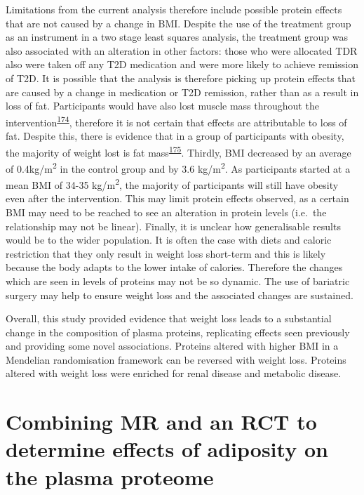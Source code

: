 \documentclass[11pt,twoside]{bristolthesis}
\begin{document}
Limitations from the current analysis therefore include possible protein effects that are not caused by a change in BMI. Despite the use of the treatment group as an instrument in a two stage least squares analysis, the treatment group was also associated with an alteration in other factors: those who were allocated TDR also were taken off any T2D medication and were more likely to achieve remission of T2D. It is possible that the analysis is therefore picking up protein effects that are caused by a change in medication or T2D remission, rather than as a result in loss of fat. Participants would have also lost muscle mass throughout the intervention\textsuperscript{\protect\hyperlink{ref-Santanasto2011}{174}}, therefore it is not certain that effects are attributable to loss of fat. Despite this, there is evidence that in a group of participants with obesity, the majority of weight lost is fat mass\textsuperscript{\protect\hyperlink{ref-Backx2016}{175}}. Thirdly, BMI decreased by an average of 0.4kg/m\textsuperscript{2} in the control group and by 3.6 kg/m\textsuperscript{2}. As participants started at a mean BMI of 34-35 kg/m\textsuperscript{2}, the majority of participants will still have obesity even after the intervention. This may limit protein effects observed, as a certain BMI may need to be reached to see an alteration in protein levels (i.e.~the relationship may not be linear). Finally, it is unclear how generalisable results would be to the wider population. It is often the case with diets and caloric restriction that they only result in weight loss short-term and this is likely because the body adapts to the lower intake of calories. Therefore the changes which are seen in levels of proteins may not be so dynamic. The use of bariatric surgery may help to ensure weight loss and the associated changes are sustained.

Overall, this study provided evidence that weight loss leads to a substantial change in the composition of plasma proteins, replicating effects seen previously and providing some novel associations. Proteins altered with higher BMI in a Mendelian randomisation framework can be reversed with weight loss. Proteins altered with weight loss were enriched for renal disease and metabolic disease.

\hypertarget{Comparison-proteome}{%
\chapter{Combining MR and an RCT to determine effects of adiposity on the plasma proteome}\label{Comparison-proteome}}
\end{document}

